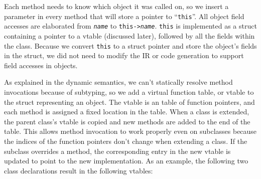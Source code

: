 \documentclass{article}
\begin{document}
Each method needs to know which object it was called on, so we insert a
parameter in every method that will store a pointer to ``\texttt{this}''.
All object field accesses are elaborated from \texttt{\emph{name}} to
\texttt{this->\emph{name}}. \texttt{this} is implemented as a struct containing
a pointer to a vtable (discussed later), followed by all the fields within the
class. Because we convert \texttt{this} to a struct pointer and store the
object's fields in the struct, we did not need to modify the IR or code
generation to support field accesses in objects.

As explained in the dynamic semantics, we can't statically resolve method
invocations because of subtyping, so we add a virtual function table, or vtable
to the struct representing an object. The vtable is an table of function
pointers, and each method is assigned a fixed location in the table. When a
class is extended, the parent class's vtable is copied and new methods are
added to the end of the table. This allows method invocation to work properly
even on subclasses because the indices of the function pointers don't change
when extending a class. If the subclass overrides a method, the corresponding
entry in the new vtable is updated to point to the new implementation. As an
example, the following two class declarations result in the following vtables:
\end{document}
